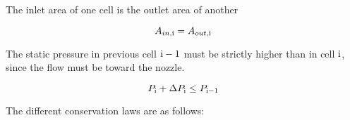The inlet area of one cell is the outlet area of another

\begin{equation}
    A_{in, \rm{i}} = A_{out, \rm{i}}
\end{equation}

The static pressure in previous cell $\rm{i}-1$ must be strictly higher
than in cell $\rm{i}$, since the flow must be toward the nozzle.

\begin{equation}
    P_{\rm{i}} + \Delta P_{\rm{i}} \leq P_{\rm{i}-1}
\end{equation}

The different conservation laws are as follows:

\begin{align}
\end{align}





%

